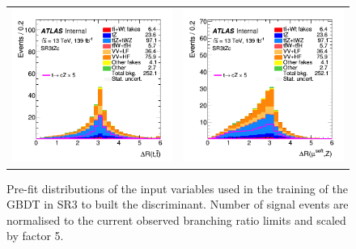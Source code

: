 \begin{figure}[htbp]
\begin{tabular}{cc}
		\includegraphics[width=.45\textwidth]{Chapters/CH5/figures/SR3_UsingSMT/ttbar_dR} &
		\includegraphics[width=.45\textwidth]{Chapters/CH5/figures/SR3_UsingSMT/softmuZ_dR} \\
	\end{tabular}
	\caption{Pre-fit distributions of the input variables used in the training of the GBDT in SR3 to built the \Dthree discriminant. Number of signal events are normalised to the current observed branching ratio limits and scaled by factor 5.  
		\ErrStatOnly
		\Blinded
	}%
	\label{fig:separation:SR3}
\end{figure}

